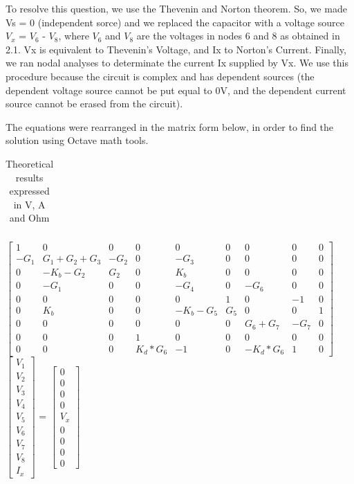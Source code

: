 \par To resolve this question, we use the Thevenin and Norton theorem. So,  we made Vs = 0 (independent sorce) and we replaced the capacitor with a voltage source $V_x$ = $V_6$ - $V_8$, where $V_6$ and $V_8$ are the voltages in nodes 6 and 8 as obtained in 2.1. Vx is equivalent to Thevenin’s Voltage, and Ix to Norton’s Current. Finally, we ran nodal analyses to determinate the current Ix supplied by Vx. We use this procedure because the circuit is complex and has dependent sources (the dependent voltage source cannot be put equal to 0V, and the dependent current source cannot be erased from the circuit).
\par The equations were rearranged in the matrix form below, in order to find the solution using Octave math tools.


\begin{table}[h]
\centering
\begin{tabularx}{0.6\textwidth} {
  | >{\raggedright\arraybackslash}X
  | >{\raggedleft\arraybackslash}X | }
 \hline

\end{tabularx}
\caption{Theoretical results expressed in V, A and Ohm}
\end{table}

\begin{center}
$\begin{bmatrix}
1 & 0 & 0 & 0 & 0 & 0 & 0 & 0 & 0\\
-G_1 & G_1+G_2+G_3 & -G_2 & 0 & -G_3 & 0 & 0 & 0 & 0\\
0 & -K_b-G_2 & G_2 & 0 & K_b & 0 & 0 & 0 & 0\\
0 & -G_1 & 0 & 0 & -G_4 & 0 & -G_6 & 0 & 0\\
0 & 0 & 0 & 0 & 0 & 1 & 0 & -1 & 0\\
0 & K_b & 0 & 0 & -K_b-G_5 & G_5 & 0 & 0 & 1\\
0 & 0 & 0 & 0 & 0 & 0 & G_6+G_7 & -G_7 & 0\\
0 & 0 & 0 & 1 & 0 & 0 & 0 & 0 & 0\\
0 & 0 & 0 & K_d*G_6 & -1 & 0 & -K_d*G_6 & 1 & 0
\end{bmatrix}$
$\begin{bmatrix}
V_1 \\ V_2 \\ V_3 \\ V_4 \\ V_5 \\ V_6 \\ V_7 \\ V_8 \\ I_x
\end{bmatrix}$
= 
$\begin{bmatrix}
0 \\ 0 \\ 0 \\ 0 \\ V_x \\ 0 \\ 0 \\ 0 \\ 0
\end{bmatrix}$
\end{center}

